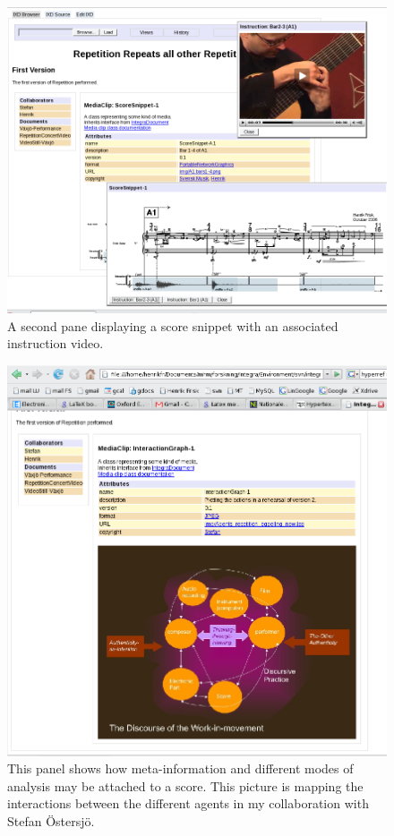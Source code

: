 \begin{figure}[htb]
  \centering
  \includegraphics[width=\linewidth]{img/Score.png}
  \caption[The IntegraBrowser: an instruction video.]{A second pane displaying a score snippet with an associated instruction video.}
  \label{fig:ib-2}
\end{figure}

\begin{figure}[htb]
  \centering
  \includegraphics[width=\linewidth]{img/Discourse.png}
  \caption[The IntegraBrowser: meta-information.]{This panel shows how meta-information and different modes of analysis may be attached to a score. This picture is mapping the interactions between the different agents in my collaboration with Stefan \"{O}stersj\"{o}.}
\label{fig:ib-3}  
\end{figure}

